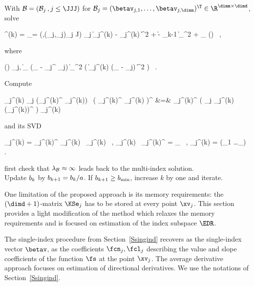 With \( \BEDR = (\BEDR_{j} \, , j \leq \JJJ) \) for 
\( \BEDR_{j} = (\betav_{j,1}, \ldots, \betav_{j,\dimm})^{\T} \in \R^{\dimm \times \dimd} \), solve 
\begin{EQA}[c]
	\prmtv^{(k)}
	=
	\arginf_{\prmtv = (\BEDR,(\fcn_{j},\fclv_{j})_{j \leq J})}
	\sum_{j} \biggl\| \Imav_{j}^{(k)} - \KSe_{j}^{(k)}  \biggr\|^{2} 
	+ \lambda \| \BEDR - \PEDR_{k-1} \|_{\Fr}^{2}
	+ \lambda_{\BEDR} \pent(\BEDR)
	\, ,
\end{EQA}
where
\begin{EQA}[c]
	\pent(\BEDR)
	\eqdef
	\sum_{j,\jc} \| \BEDR_{\jc} (\Id_{\dimd} - \BEDR_{j}^{\T} \BEDR_{j}) \|_{\Fr}^{2} 
	\;
	\Kern\bigl( \| \TEDR_{j}^{(k)} (\xv_{\jc} - \xv_{j}) \|^{2} \bigr)
	\, .
\end{EQA}
Compute
\begin{EQA}[rcl]
	\JEDR_{j}^{(k)}
	\eqdef
	\sum_{j} ({\BEDR_{j}^{(k)}}^{\T} {\fclv}_{j}^{(k)}) \, \bigl( {\BEDR_{j}^{(k)}}^{\T} {\fclv}_{j}^{(k)} \bigr)^{\T}
	&=&
	{\BEDR_{j}^{(k)}}^{\T} \Bigl( \sum_{j} {\fclv}_{j}^{(k)} \, ({\fclv}_{j}^{(k)})^{\T} \Bigr) \BEDR_{j}^{(k)}
\end{EQA}
and its SVD
\begin{EQA}[c]
	\JEDR_{j}^{(k)}
	=
	{\PEDR_{j}^{(k)}}^{\T} \Lambda_{j}^{(k)} \, \PEDR_{j}^{(k)}
	\, ,
	\qquad
	\PEDR_{j}^{(k)} \, {\PEDR_{j}^{(k)}}^{\T}
	= 
	\Id_{\dimm}
	\, ,
	\quad
	\Lambda_{j}^{(k)} = \diag(\lambda_{1} \geq \ldots \geq \lambda_{\dimm})
	\, .
\end{EQA}
{\color{blue} first check that \( \lambda_{\mathcal{B}} \approx \infty \) leads back to the multi-index solution.}
\\
Update \( b_{k} \) by \( b_{k+1} = b_{k}/a \).
If \( b_{k+1} \geq b_{\min} \),
increase \( k \) by one and iterate.
 


\label{Saverder}

One limitation of the proposed approach is its memory requirements: the \( (\dimd+1) \)-matrix \( \KSe_{j} \)
has to be stored at every point \( \xv_{j} \).
%
This section provides a light modification of the method 
which relaxes the memory requirements and is focused on estimation of the index subspace \( \EDR \).


\label{Saverdersi}
The single-index procedure from Section~\ref{Ssingind} recovers 
as the single-index vector \( \betav \), as the coefficients \( \fcn_{j}, \fcl_{j} \)
describing the value and slope coefficients of the function \( \fs \) at the point \( \xv_{j} \).
The average derivative approach focuses on estimation of directional derivatives. 
We use the notations of Section~\ref{Ssingind}.

